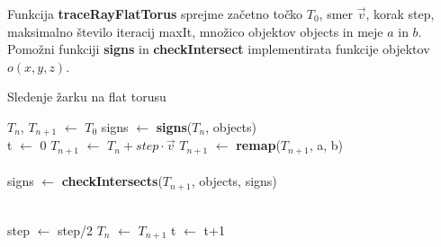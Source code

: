 \documentclass[titlepage]{article}
\begin{document}
Funkcija \textbf{traceRayFlatTorus} sprejme začetno točko $T_{0}$, smer $\vec{v}$, korak step, maksimalno število iteracij maxIt, množico objektov objects in meje $a$ in $b$.
Pomožni funkciji \textbf{signs} in \textbf{checkIntersect} implementirata funkcije objektov \( o(x,y,z) \).
\begin{algorithm}[H]
    \caption{Sledenje žarku na flat torusu}
\begin{algorithmic}

    \State $T_{n}$, $T_{n+1}$ $\gets$ $T_{0}$
    \State signs $\gets$ \textbf{signs}($T_{n}$, objects)
    \\
    \State t $\gets$ 0
      \State {}
      \State {}
    \EndIf
    \State $T_{n+1}$ $\gets$ $T_{n}+step \cdot \vec{v}$
    \State $T_{n+1}$ $\gets$ \textbf{remap}($T_{n+1}$, a, b)
    \\
    \\
    \State signs $\gets$ \textbf{checkIntersects}($T_{n+1}$, objects, signs)
    \\
    \\

        \State step $\gets$ step/2
    \Else
      \State $T_{n}$ $\gets$ $T_{n+1}$
      \State t $\gets$ t+1
    \EndIf
  \EndWhile
\EndFunction
\end{algorithmic}
\end{algorithm}

\newpage
\end{document}
